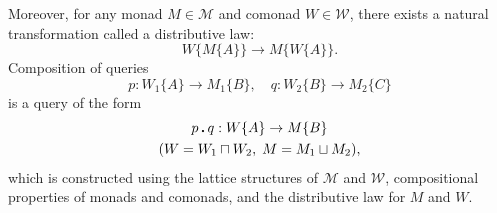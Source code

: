Moreover, for any monad $M\in\mathcal{M}$ and comonad $W\in\mathcal{W}$, there
exists a natural transformation called a distributive law:
\begin{equation*}
    W\{M\{A\}\} \to M\{W\{A\}\}.
\end{equation*}
Composition of queries
\begin{equation*}
    p : W_1\{A\} \to M_1\{B\}, \quad q : W_2\{B\} \to M_2\{C\}
\end{equation*}
is a query of the form
\begin{multline*}
    p\,\boldsymbol{.}\,q : W\{A\} \to M\{B\} \\ (W = W_1 \sqcap W_2,\; M = M_1 \sqcup M_2),
\end{multline*}
which is constructed using the lattice structures of $\mathcal{M}$ and
$\mathcal{W}$, compositional properties of monads and comonads, and the
distributive law for $M$ and $W$.

